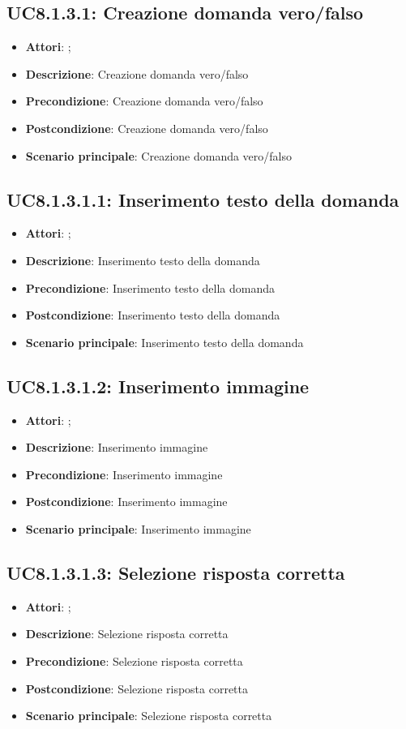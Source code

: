 \subsection{UC8.1.3.1: Creazione domanda vero/falso}
\label{UC8.1.3.1}
\begin{itemize}
\item \textbf{Attori}: ;
\item \textbf{Descrizione}: Creazione domanda vero/falso
\item \textbf{Precondizione}: Creazione domanda vero/falso
\item \textbf{Postcondizione}: Creazione domanda vero/falso
\item \textbf{Scenario principale}:
Creazione domanda vero/falso
\end{itemize}

\subsection{UC8.1.3.1.1: Inserimento testo della domanda}
\label{UC8.1.3.1.1}
\begin{itemize}
\item \textbf{Attori}: ;
\item \textbf{Descrizione}: Inserimento testo della domanda
\item \textbf{Precondizione}: Inserimento testo della domanda
\item \textbf{Postcondizione}: Inserimento testo della domanda
\item \textbf{Scenario principale}:
Inserimento testo della domanda
\end{itemize}

\subsection{UC8.1.3.1.2: Inserimento immagine}
\label{UC8.1.3.1.2}
\begin{itemize}
\item \textbf{Attori}: ;
\item \textbf{Descrizione}: Inserimento immagine
\item \textbf{Precondizione}: Inserimento immagine
\item \textbf{Postcondizione}: Inserimento immagine
\item \textbf{Scenario principale}:
Inserimento immagine
\end{itemize}

\subsection{UC8.1.3.1.3: Selezione risposta corretta}
\label{UC8.1.3.1.3}
\begin{itemize}
\item \textbf{Attori}: ;
\item \textbf{Descrizione}: Selezione risposta corretta
\item \textbf{Precondizione}: Selezione risposta corretta
\item \textbf{Postcondizione}: Selezione risposta corretta
\item \textbf{Scenario principale}:
Selezione risposta corretta
\end{itemize}

